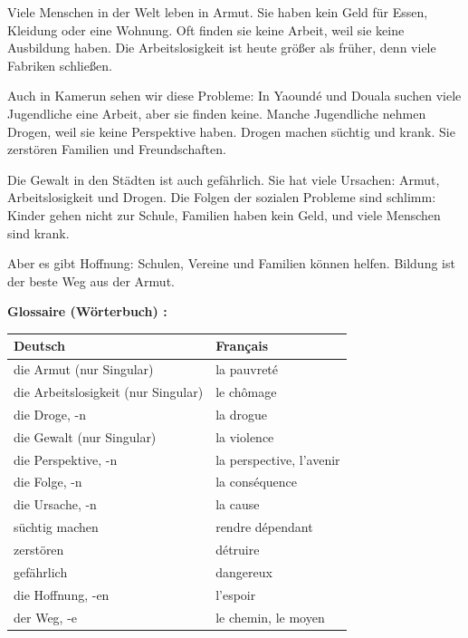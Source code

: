 \documentclass[11pt]{article}
\newcounter{popsec}
\newcounter{popsub}
\newcommand{\courssub}[1]{%
  \stepcounter{popsub}%
  \par\vspace{9pt}\noindent{\popxbold\fontsize{11.5}{13}\selectfont\color{popink}{\color{poporange}\thepopsec.\thepopsub}\hspace{6pt}#1}\par\nopagebreak\vspace{4pt}
}
\begin{document}
\courssub{Le texte support (rappel)}

\begin{textebox}
Viele Menschen in der Welt leben in Armut. Sie haben kein Geld für Essen, Kleidung oder eine Wohnung. Oft finden sie keine Arbeit, weil sie keine Ausbildung haben. Die Arbeitslosigkeit ist heute größer als früher, denn viele Fabriken schließen.

Auch in Kamerun sehen wir diese Probleme: In Yaoundé und Douala suchen viele Jugendliche eine Arbeit, aber sie finden keine. Manche Jugendliche nehmen Drogen, weil sie keine Perspektive haben. Drogen machen süchtig und krank. Sie zerstören Familien und Freundschaften.

Die Gewalt in den Städten ist auch gefährlich. Sie hat viele Ursachen: Armut, Arbeitslosigkeit und Drogen. Die Folgen der sozialen Probleme sind schlimm: Kinder gehen nicht zur Schule, Familien haben kein Geld, und viele Menschen sind krank.

Aber es gibt Hoffnung: Schulen, Vereine und Familien können helfen. Bildung ist der beste Weg aus der Armut.
\end{textebox}

\textbf{Glossaire (Wörterbuch) :}

\begin{center}
\begin{tabularx}{\linewidth}{|X|X|}\hline
\rowcolor{popblueL} \textbf{Deutsch} & \textbf{Français} \\ \hline
die Armut (nur Singular) & la pauvreté \\ \hline
die Arbeitslosigkeit (nur Singular) & le chômage \\ \hline
die Droge, -n & la drogue \\ \hline
die Gewalt (nur Singular) & la violence \\ \hline
die Perspektive, -n & la perspective, l'avenir \\ \hline
die Folge, -n & la conséquence \\ \hline
die Ursache, -n & la cause \\ \hline
süchtig machen & rendre dépendant \\ \hline
zerstören & détruire \\ \hline
gefährlich & dangereux \\ \hline
die Hoffnung, -en & l'espoir \\ \hline
der Weg, -e & le chemin, le moyen \\ \hline
\end{tabularx}
\end{center}
\end{document}
